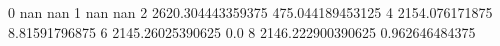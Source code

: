 0 nan nan
1 nan nan
2 2620.304443359375 475.044189453125
4 2154.076171875 8.81591796875
6 2145.26025390625 0.0
8 2146.222900390625 0.962646484375
